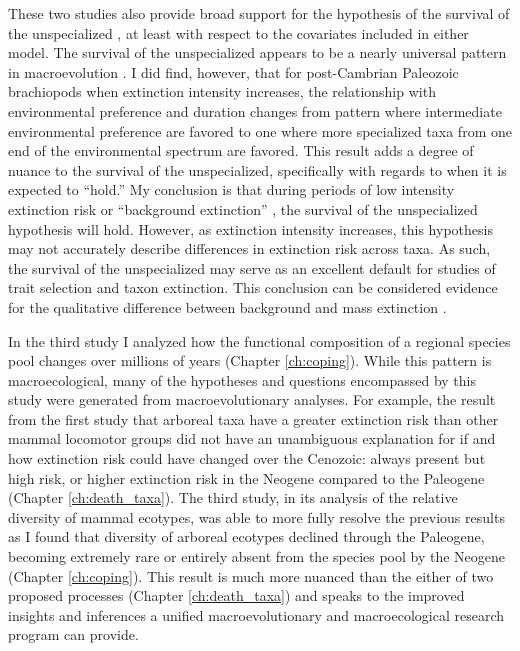 These two studies also provide broad support for the hypothesis of the survival of the unspecialized \citep{Simpson1944}, at least with respect to the covariates included in either model. The survival of the unspecialized appears to be a nearly universal pattern in macroevolution \citep{Simpson1944,Liow2004a,Liow2007b,Nurnberg2013a,Nurnberg2015,Baumiller1993,Raia2016}. I did find, however, that for post-Cambrian Paleozoic brachiopods when extinction intensity increases, the relationship with environmental preference and duration changes from pattern where intermediate environmental preference are favored to one where more specialized taxa from one end of the environmental spectrum are favored. This result adds a degree of nuance to the survival of the unspecialized, specifically with regards to when it is expected to ``hold.'' My conclusion is that during periods of low intensity extinction risk or ``background extinction'' \citep{Jablonski1986,Foote2007b}, the survival of the unspecialized hypothesis will hold. However, as extinction intensity increases, this hypothesis may not accurately describe differences in extinction risk across taxa. As such, the survival of the unspecialized may serve as an excellent default for studies of trait selection and taxon extinction. This conclusion can be considered evidence for the qualitative difference between background and mass extinction \citep{Jablonski1986}.

In the third study I analyzed how the functional composition of a regional species pool changes over millions of years (Chapter \ref{ch:coping}). While this pattern is macroecological, many of the hypotheses and questions encompassed by this study were generated from macroevolutionary analyses. For example, the result from the first study that arboreal taxa have a greater extinction risk than other mammal locomotor groups did not have an unambiguous explanation for if and how extinction risk could have changed over the Cenozoic: always present but high risk, or higher extinction risk in the Neogene compared to the Paleogene (Chapter \ref{ch:death_taxa}). The third study, in its analysis of the relative diversity of mammal ecotypes, was able to more fully resolve the previous results as I found that diversity of arboreal ecotypes declined through the Paleogene, becoming extremely rare or entirely absent from the species pool by the Neogene (Chapter \ref{ch:coping}). This result is much more nuanced than the either of two proposed processes (Chapter \ref{ch:death_taxa}) and speaks to the improved insights and inferences a unified macroevolutionary and macroecological research program can provide.

